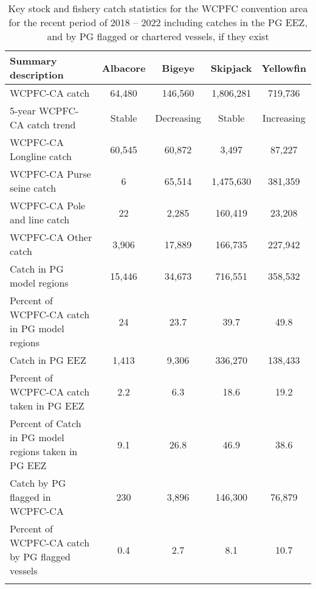 \begin{longtable}{lcccc}
\caption{Key stock and fishery catch statistics for the WCPFC convention area for the recent period of 2018 -- 2022 including catches in the PG EEZ, and by PG flagged or chartered vessels, if they exist} \\ 
  \hline
Summary description & Albacore & Bigeye & Skipjack & Yellowfin \\ 
  \hline
WCPFC-CA catch & 64,480 & 146,560 & 1,806,281 & 719,736 \\ 
  5-year WCPFC-CA catch trend & Stable & Decreasing & Stable & Increasing \\ 
  WCPFC-CA Longline catch & 60,545 & 60,872 & 3,497 & 87,227 \\ 
  WCPFC-CA Purse seine catch & 6 & 65,514 & 1,475,630 & 381,359 \\ 
  WCPFC-CA Pole and line catch & 22 & 2,285 & 160,419 & 23,208 \\ 
  WCPFC-CA Other catch & 3,906 & 17,889 & 166,735 & 227,942 \\ 
  Catch in PG model regions & 15,446 & 34,673 & 716,551 & 358,532 \\ 
  Percent of WCPFC-CA catch in PG model regions & 24 & 23.7 & 39.7 & 49.8 \\ 
   \hline
Catch in PG EEZ & 1,413 & 9,306 & 336,270 & 138,433 \\ 
  Percent of WCPFC-CA catch taken in PG EEZ & 2.2 & 6.3 & 18.6 & 19.2 \\ 
  Percent of Catch in PG model regions taken in PG EEZ & 9.1 & 26.8 & 46.9 & 38.6 \\ 
  Catch by PG flagged in WCPFC-CA & 230 & 3,896 & 146,300 & 76,879 \\ 
  Percent of WCPFC-CA catch by PG flagged vessels & 0.4 & 2.7 & 8.1 & 10.7 \\ 
  \hline
\label{cat_sum_tab}
\end{longtable}
